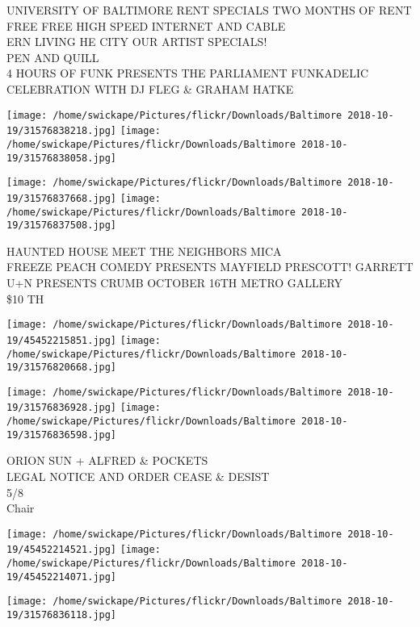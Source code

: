\documentclass[10pt,letterpaper]{article}
\begin{document}
UNIVERSITY OF BALTIMORE RENT SPECIALS TWO MONTHS OF RENT FREE FREE HIGH SPEED INTERNET AND CABLE\\
ERN LIVING HE CITY OUR ARTIST SPECIALS!\\
PEN AND QUILL\\
4 HOURS OF FUNK PRESENTS THE PARLIAMENT FUNKADELIC CELEBRATION WITH DJ FLEG \& GRAHAM HATKE\\
\pagebreak

\texttt{[image: /home/swickape/Pictures/flickr/Downloads/Baltimore 2018-10-19/31576838218.jpg]}
\texttt{[image: /home/swickape/Pictures/flickr/Downloads/Baltimore 2018-10-19/31576838058.jpg]}

\texttt{[image: /home/swickape/Pictures/flickr/Downloads/Baltimore 2018-10-19/31576837668.jpg]}
\texttt{[image: /home/swickape/Pictures/flickr/Downloads/Baltimore 2018-10-19/31576837508.jpg]}

HAUNTED HOUSE MEET THE NEIGHBORS MICA\\
FREEZE PEACH COMEDY PRESENTS MAYFIELD PRESCOTT!  GARRETT\\
U+N PRESENTS CRUMB OCTOBER 16TH METRO GALLERY\\
\$10 TH\\
\pagebreak

\texttt{[image: /home/swickape/Pictures/flickr/Downloads/Baltimore 2018-10-19/45452215851.jpg]}
\texttt{[image: /home/swickape/Pictures/flickr/Downloads/Baltimore 2018-10-19/31576820668.jpg]}

\texttt{[image: /home/swickape/Pictures/flickr/Downloads/Baltimore 2018-10-19/31576836928.jpg]}
\texttt{[image: /home/swickape/Pictures/flickr/Downloads/Baltimore 2018-10-19/31576836598.jpg]}

ORION SUN + ALFRED \& POCKETS\\
LEGAL NOTICE AND ORDER CEASE \& DESIST\\
5/8\\
Chair\\
\pagebreak

\texttt{[image: /home/swickape/Pictures/flickr/Downloads/Baltimore 2018-10-19/45452214521.jpg]}
\texttt{[image: /home/swickape/Pictures/flickr/Downloads/Baltimore 2018-10-19/45452214071.jpg]}

\vspace{0.25in}
\texttt{[image: /home/swickape/Pictures/flickr/Downloads/Baltimore 2018-10-19/31576836118.jpg]}
\end{document}
